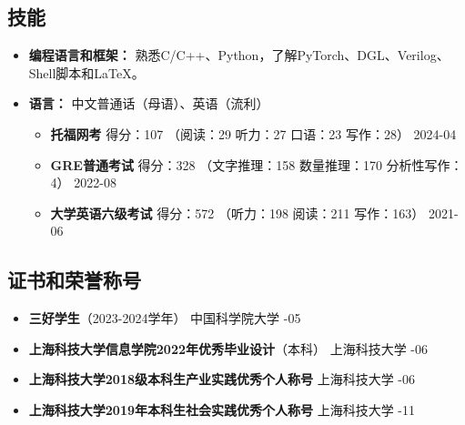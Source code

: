 \documentclass[a4paper,10pt]{ctexart} %
\begin{document}
\begin{keepsection}

\section{技能}
\begin{itemize}
    \item \textbf{编程语言和框架：} 熟悉C/C++、Python，了解PyTorch、DGL、Verilog、Shell脚本和\LaTeX。
    \item \textbf{语言：} 中文普通话（母语）、英语（流利）
        \begin{itemize}
            \item \textbf{托福网考} \quad 得分：107 {\small （阅读：29 \quad 听力：27 \quad 口语：23 \quad 写作：28）} \hfill 2024-04
            \item \textbf{GRE普通考试} \quad 得分：328 {\small （文字推理：158 \quad 数量推理：170 \quad 分析性写作：4）} \hfill 2022-08
            \item \textbf{大学英语六级考试} \quad 得分：572 {\small （听力：198 \quad 阅读：211 \quad 写作：163）} \hfill 2021-06
        \end{itemize}
\end{itemize}

\end{keepsection}



\begin{keepsection}

\section{证书和荣誉称号}
\begin{itemize}
    \item \textbf{三好学生}（2023-2024学年） \hfill 中国科学院大学 -05
    \item \textbf{上海科技大学信息学院2022年优秀毕业设计}（本科） \hfill 上海科技大学 -06
    \item \textbf{上海科技大学2018级本科生产业实践优秀个人称号} \hfill 上海科技大学 -06
    \item \textbf{上海科技大学2019年本科生社会实践优秀个人称号} \hfill 上海科技大学 -11
\end{itemize}

\end{keepsection}
\end{document}
